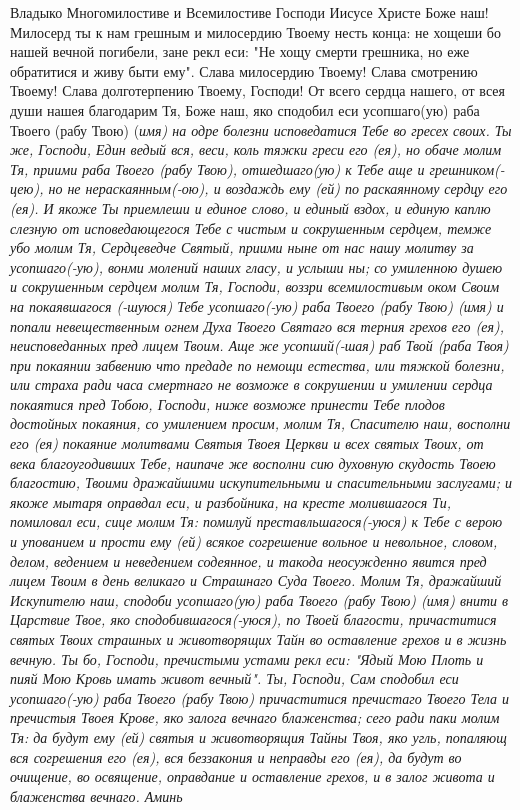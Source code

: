 Владыко Многомилостиве и Всемилостиве Господи Иисусе Христе Боже наш! Милосерд ты к нам грешным и милосердию Твоему несть конца: не хощеши бо нашей вечной погибели, зане рекл еси: "Не хощу смерти грешника, но еже обратитися и живу быти ему". Слава милосердию Твоему! Слава смотрению Твоему! Слава долготерпению Твоему, Господи! От всего сердца нашего, от всея души нашея благодарим Тя, Боже наш, яко сподобил еси усопшаго(ую) раба Твоего (рабу Твою) (\itshape имя\normalfont{}) на одре болезни исповедатися Тебе во гресех своих. Ты же, Господи, Един ведый вся, веси, коль тяжки греси его (ея), но обаче молим Тя, приими раба Твоего (рабу Твою), отшедшаго(ую) к Тебе аще и грешником(-цею), но не нераскаянным(-ою), и воздаждь ему (ей) по раскаянному сердцу его (ея). И якоже Ты приемлеши и единое слово, и единый вздох, и единую каплю слезную от исповедающегося Тебе с чистым и сокрушенным сердцем, темже убо молим Тя, Сердцеведче Святый, приими ныне от нас нашу молитву за усопшаго(-ую), вонми молений наших гласу, и услыши ны; со умиленною душею и сокрушенным сердцем молим Тя, Господи, воззри всемилостивым оком Своим на покаявшагося (-шуюся) Тебе усопшаго(-ую) раба Твоего (рабу Твою) (имя) и попали невещественным огнем Духа Твоего Святаго вся терния грехов его (ея), неисповеданных пред лицем Твоим. Аще же усопший(-шая) раб Твой (раба Твоя) при покаянии забвению что предаде по немощи естества, или тяжкой болезни, или страха ради часа смертнаго не возможе в сокрушении и умилении сердца покаятися пред Тобою, Господи, ниже возможе принести Тебе плодов достойных покаяния, со умилением просим, молим Тя, Спасителю наш, восполни его (ея) покаяние молитвами Святыя Твоея Церкви и всех святых Твоих, от века благоугодивших Тебе, наипаче же восполни сию духовную скудость Твоею благостию, Твоими дражайшими искупительными и спасительными заслугами; и якоже мытаря оправдал еси, и разбойника, на кресте молившагося Ти, помиловал еси, сице молим Тя: помилуй преставльшагося(-уюся) к Тебе с верою и упованием и прости ему (ей) всякое согрешение вольное и невольное, словом, делом, ведением и неведением содеянное, и такода неосужденно явится пред лицем Твоим в день великаго и Страшнаго Суда Твоего. Молим Тя, дражайший Искупителю наш, сподоби усопшаго(ую) раба Твоего (рабу Твою) (\itshape имя\normalfont{}) внити в Царствие Твое, яко сподобившагося(-уюся), по Твоей благости, причаститися святых Твоих страшных и животворящих Тайн во оставление грехов и в жизнь вечную. Ты бо, Господи, пречистыми устами рекл еси: "Ядый Мою Плоть и пияй Мою Кровь имать живот вечный". Ты, Господи, Сам сподобил еси усопшаго(-ую) раба Твоего (рабу Твою) причаститися пречистаго Твоего Тела и пречистыя Твоея Крове, яко залога вечнаго блаженства; сего ради паки молим Тя: да будут ему (ей) святыя и животворящия Тайны Твоя, яко угль, попаляющ вся согрешения его (ея), вся беззакония и неправды его (ея), да будут во очищение, во освящение, оправдание и оставление грехов, и в залог живота и блаженства вечнаго. Аминь 


